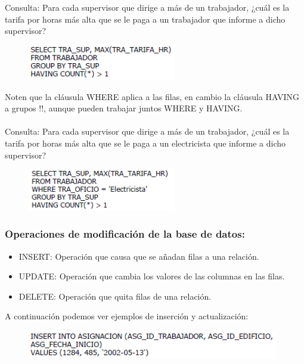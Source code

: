 \documentclass[preprint,12pt]{elsarticle}
\begin{document}
Consulta: Para cada supervisor que dirige a más de un trabajador, ¿cuál es la tarifa por horas más alta que se le paga a un trabajador que informe a dicho supervisor?

	\begin{figure}[htb]
		\begin{center}
			\includegraphics[width=6.5cm]{./IMAGENES/group2}
		\end{center}
	\end{figure}

Noten que la cláusula WHERE aplica a las filas, en cambio la cláusula HAVING a grupos !!, aunque pueden trabajar juntos WHERE y HAVING.\\ \\ Consulta: Para cada supervisor que dirige a más de un trabajador, ¿cuál es la tarifa por horas más alta que se le paga a un electricista que informe a dicho supervisor?

	\begin{figure}[htb]
		\begin{center}
			\includegraphics[width=6.5cm]{./IMAGENES/group3}
		\end{center}
	\end{figure}

\subsubsection{\textbf{Operaciones de modificación de la base de datos:}}
\begin{itemize}
\item INSERT: Operación que causa que se añadan filas a una relación.
\item UPDATE: Operación que cambia los valores de las columnas en las filas.
\item DELETE: Operación que quita filas de una relación.
\end{itemize}

A continuación podemos ver ejemplos de inserción y actualización:
	\begin{figure}[htb]
		\begin{center}
			\includegraphics[width=11cm]{./IMAGENES/insert}
		\end{center}
	\end{figure}
\end{document}
